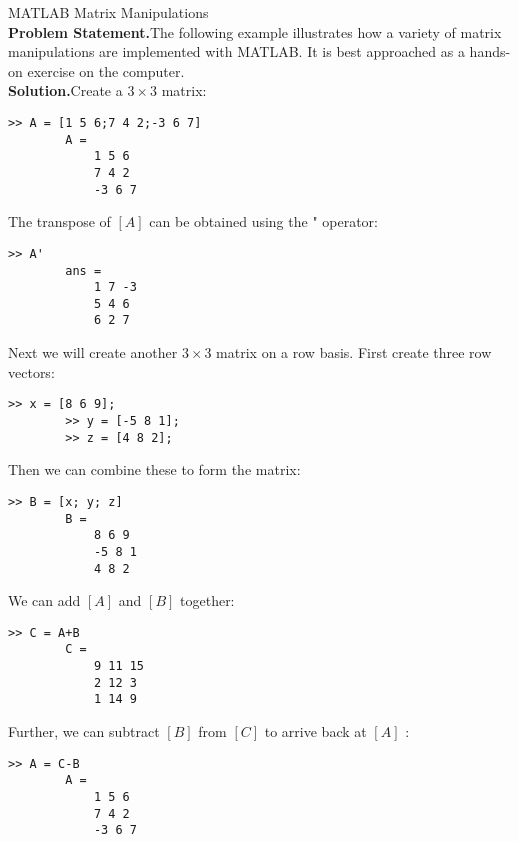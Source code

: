 \documentclass[../main.tex]{subfiles}
\begin{document}
\begin{example} MATLAB Matrix Manipulations\\

    \noindent\textbf{Problem Statement.}\quad The following example illustrates how a variety of matrix manipulations are implemented with MATLAB. It is best approached as a hands-on exercise on the computer.\\


    \noindent\textbf{Solution.}\quad Create a $3 \times 3$ matrix:\\

    \begin{lstlisting}[numbers=none,frame=none]
        >> A = [1 5 6;7 4 2;-3 6 7]
        A =
            1 5 6
            7 4 2
            -3 6 7
	\end{lstlisting}

    \noindent The transpose of $[A]$ can be obtained using the " operator:

    \begin{lstlisting}[numbers=none,frame=none]
        >> A'
        ans =
            1 7 -3
            5 4 6
            6 2 7
	\end{lstlisting}

    \noindent Next we will create another $3 \times 3$ matrix on a row basis. First create three row vectors:

    \begin{lstlisting}[numbers=none,frame=none]
        >> x = [8 6 9];
        >> y = [-5 8 1];
        >> z = [4 8 2];
	\end{lstlisting}

    \noindent Then we can combine these to form the matrix:

    \begin{lstlisting}[numbers=none,frame=none]
        >> B = [x; y; z]
        B =
            8 6 9
            -5 8 1
            4 8 2
	\end{lstlisting}

    \noindent We can add $[A]$ and $[B]$ together:

    \begin{lstlisting}[numbers=none,frame=none]
        >> C = A+B
        C =
            9 11 15
            2 12 3
            1 14 9
	\end{lstlisting}

    \noindent Further, we can subtract $[B]$ from $[C]$ to arrive back at $[A]$ :

    \begin{lstlisting}[numbers=none,frame=none]
        >> A = C-B
        A =
            1 5 6
            7 4 2
            -3 6 7
	\end{lstlisting}


\end{example}
\end{document}

